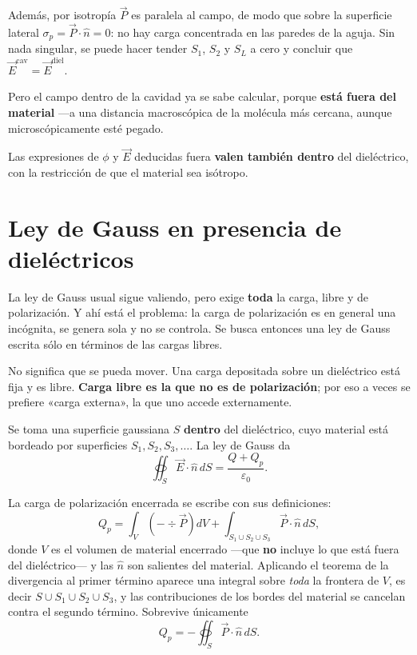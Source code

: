\documentclass[12pt,a4paper]{article}
\begin{document}
Además, por isotropía $\vec P$ es paralela al campo, de modo que sobre la
superficie lateral $\sigma_p = \vec P \cdot \hat n = 0$: no hay carga concentrada
en las paredes de la aguja. Sin nada singular, se puede hacer tender $S_1$, $S_2$
y $S_L$ a cero y concluir que $\vec E^{\text{cav}} = \vec E^{\text{diel}}$.

Pero el campo dentro de la cavidad ya se sabe calcular, porque \textbf{está fuera
del material} ---a una distancia macroscópica de la molécula más cercana, aunque
microscópicamente esté pegado.

\begin{keybox}[Conclusión]
Las expresiones de $\phi$ y $\vec E$ deducidas fuera \textbf{valen también
dentro} del dieléctrico, con la restricción de que el material sea isótropo.
\end{keybox}

\section{Ley de Gauss en presencia de dieléctricos}

La ley de Gauss usual sigue valiendo, pero exige \textbf{toda} la carga, libre y
de polarización. Y ahí está el problema: la carga de polarización es en general
una incógnita, se genera sola y no se controla. Se busca entonces una ley de
Gauss escrita sólo en términos de las cargas libres.

\begin{warnbox}
No significa que se pueda mover. Una carga depositada sobre un dieléctrico está
fija y es libre. \textbf{Carga libre es la que no es de polarización}; por eso a
veces se prefiere «carga externa», la que uno accede externamente.
\end{warnbox}

Se toma una superficie gaussiana $S$ \textbf{dentro} del dieléctrico, cuyo
material está bordeado por superficies $S_1, S_2, S_3, \dots$. La ley de Gauss da
\[
\oiint_S \vec E \cdot \hat n \, dS = \frac{Q + Q_p}{\varepsilon_0}.
\]

La carga de polarización encerrada se escribe con sus definiciones:
\[
Q_p = \int_V \left(-\div \vec P\right) dV
+ \int_{S_1 \cup S_2 \cup S_3} \vec P \cdot \hat n \, dS ,
\]
donde $V$ es el volumen de material encerrado ---que \textbf{no} incluye lo que
está fuera del dieléctrico--- y las $\hat n$ son salientes del material.
Aplicando el teorema de la divergencia al primer término aparece una integral
sobre \emph{toda} la frontera de $V$, es decir $S \cup S_1 \cup S_2 \cup S_3$, y
las contribuciones de los bordes del material se cancelan contra el segundo
término. Sobrevive únicamente
\[
Q_p = -\oiint_S \vec P \cdot \hat n \, dS .
\]
\end{document}
